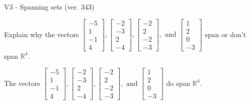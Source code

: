 \begin{exercise}
  \begin{exerciseTitle}V3 - Spanning sets (ver. 343)\end{exerciseTitle}
  \begin{exerciseStatement}
    Explain why the vectors \(\left[\begin{array}{r}
-5 \\
1 \\
-1 \\
4
\end{array}\right] , \left[\begin{array}{r}
-2 \\
-3 \\
2 \\
-4
\end{array}\right] , \left[\begin{array}{r}
-2 \\
2 \\
-2 \\
-3
\end{array}\right] , \text{ and } \left[\begin{array}{r}
1 \\
2 \\
0 \\
-3
\end{array}\right]\) span or don't span \(\mathbb{R}^4\). 
	


  \end{exerciseStatement}
  \begin{exerciseAnswer}
   The vectors \(\left[\begin{array}{r}
-5 \\
1 \\
-1 \\
4
\end{array}\right] , \left[\begin{array}{r}
-2 \\
-3 \\
2 \\
-4
\end{array}\right] , \left[\begin{array}{r}
-2 \\
2 \\
-2 \\
-3
\end{array}\right] , \text{ and } \left[\begin{array}{r}
1 \\
2 \\
0 \\
-3
\end{array}\right]\) 
  	 do  
	span \(\mathbb{R}^4\).
  


  \end{exerciseAnswer}
\end{exercise}